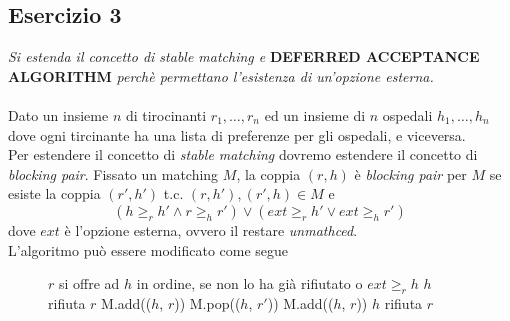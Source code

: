 \documentclass{article}
\begin{document}
        \subsection{Esercizio 3}
            \textit{Si estenda il concetto di stable matching e} \textbf{DEFERRED ACCEPTANCE ALGORITHM} \textit{perchè permettano l'esistenza di un'opzione esterna.}\\
            \\
            Dato un insieme $ n $ di tirocinanti $ r_1, \dots, r_n $ ed un insieme di $ n $ ospedali $ h_1, \dots, h_n $ dove ogni tircinante ha una lista di preferenze per gli ospedali, e viceversa.\\
            Per estendere il concetto di \textit{stable matching} dovremo estendere il concetto di \textit{blocking pair}. Fissato un matching $ M $, la coppia $ (r,h) $ è \textit{blocking pair} per $ M $ se esiste la coppia $ (r', h') $ t.c. $ (r, h'), (r', h) \in M $ e
            \[
                (h \geq_r h' \wedge r \geq_h r') \vee (ext \geq_r h' \vee ext \geq_h r')
            \]
            dove $ ext $ è l'opzione esterna, ovvero il restare \textit{unmathced}.\\
            L'algoritmo può essere modificato come segue
            \begin{figure}[htb]\hspace*{\fill}%
                \begin{algorithmic}[1]
                        \State $ r $ si offre ad $ h $ in ordine, se non lo ha già rifiutato o $ ext \geq_r h $
                                \State $ h $ rifiuta $ r $
                            \Else
                                \State M.add(($ h $, $ r $))
                            \EndIf
                        \Else
                                \State M.pop(($ h $, $ r' $))
                                \State M.add(($ h $, $ r $))
                            \Else
                                \State $ h $ rifiuta $ r $
                            \EndIf
                        \EndIf
                    \EndWhile
                \end{algorithmic}\hspace*{\fill}
            \end{figure}
        \newpage
\end{document}
